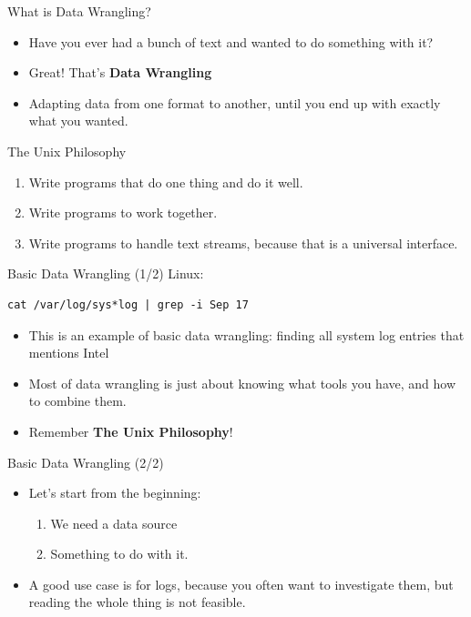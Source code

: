 \documentclass[12pt]{beamer}
\begin{document}
\begin{frame}{What is Data Wrangling?}
  \begin{itemize}
    \item Have you ever had a bunch of text and wanted to do something with it?
    \item Great! That's \textbf{Data Wrangling}
    \item Adapting data from one format to another, until you end up with exactly what you wanted.
  \end{itemize}
\end{frame}


\begin{frame}{The Unix Philosophy}
  \begin{enumerate}
    \item Write programs that do one thing and do it well.
    \item Write programs to work together.
    \item Write programs to handle text streams, because that is a universal interface.
  \end{enumerate}
\end{frame}

\begin{frame}[fragile]{Basic Data Wrangling (1/2)}
  Linux:
  \begin{verbatim}
cat /var/log/sys*log | grep -i Sep 17
  \end{verbatim}
  \begin{itemize}
    \item This is an example of basic data wrangling: finding all system log entries that mentions Intel
    \item Most of data wrangling is just about knowing what tools you have, and how to combine them.
    \item Remember \textbf{The Unix Philosophy}!
  \end{itemize}
\end{frame}

\begin{frame}{Basic Data Wrangling (2/2)}
  \begin{itemize}
    \item Let's start from the beginning:
          \begin{enumerate}
            \item We need a data source
            \item Something to do with it.
          \end{enumerate}
    \item A good use case is for logs, because you often want to investigate them, but reading the whole thing is not feasible.
  \end{itemize}
\end{frame}
\end{document}
